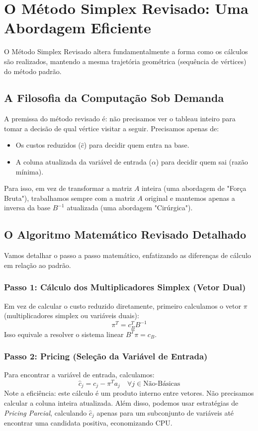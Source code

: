 \documentclass[12pt, a4paper]{article}
\begin{document}
\section{O Método Simplex Revisado: Uma Abordagem Eficiente}
O Método Simplex Revisado altera fundamentalmente a forma como os cálculos são realizados, mantendo a mesma trajetória geométrica (sequência de vértices) do método padrão.

\subsection{A Filosofia da Computação Sob Demanda}
A premissa do método revisado é: não precisamos ver o tableau inteiro para tomar a decisão de qual vértice visitar a seguir. Precisamos apenas de:
\begin{itemize}
    \item Os custos reduzidos ($\hat{c}$) para decidir quem entra na base.
    \item A coluna atualizada da variável de entrada ($\alpha$) para decidir quem sai (razão mínima).
\end{itemize}
Para isso, em vez de transformar a matriz $A$ inteira (uma abordagem de "Força Bruta"), trabalhamos sempre com a matriz $A$ original e mantemos apenas a inversa da base $B^{-1}$ atualizada (uma abordagem "Cirúrgica").

\subsection{O Algoritmo Matemático Revisado Detalhado}
Vamos detalhar o passo a passo matemático, enfatizando as diferenças de cálculo em relação ao padrão.

\subsubsection{Passo 1: Cálculo dos Multiplicadores Simplex (Vetor Dual)}
Em vez de calcular o custo reduzido diretamente, primeiro calculamos o vetor $\pi$ (multiplicadores simplex ou variáveis duais):
\begin{equation}
    \pi^T = c_B^T B^{-1}
\end{equation}
Isso equivale a resolver o sistema linear $B^T \pi = c_B$.

\subsubsection{Passo 2: Pricing (Seleção da Variável de Entrada)}
Para encontrar a variável de entrada, calculamos:
\begin{equation}
    \hat{c}_j = c_j - \pi^T a_j \quad \forall j \in \text{Não-Básicas}
\end{equation}
Note a eficiência: este cálculo é um produto interno entre vetores. Não precisamos calcular a coluna inteira atualizada. Além disso, podemos usar estratégias de \textit{Pricing Parcial}, calculando $\hat{c}_j$ apenas para um subconjunto de variáveis até encontrar uma candidata positiva, economizando CPU.
\end{document}
